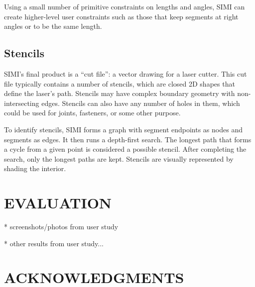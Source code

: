 \documentclass{article}
\begin{document}
Using a small number of primitive constraints on lengths and angles,
SIMI can create higher-level user constraints such as those that keep
segments at right angles or to be the same length.

\subsection{Stencils}

SIMI's final product is a ``cut file'': a vector drawing for a laser
cutter. This cut file typically contains a number of stencils, which
are closed 2D shapes that define the laser's path. Stencils may have
complex boundary geometry with non-intersecting edges. Stencils can
also have any number of holes in them, which could be used for joints,
fasteners, or some other purpose.

To identify stencils, SIMI forms a graph with segment endpoints as
nodes and segments as edges. It then runs a depth-first search. The
longest path that forms a cycle from a given point is considered a
possible stencil. After completing the search, only the longest paths
are kept. Stencils are visually represented by shading the
interior. 

\section{EVALUATION}

* screenshots/photos from user study

* other results from user study...

\section{ACKNOWLEDGMENTS}



\end{document}
